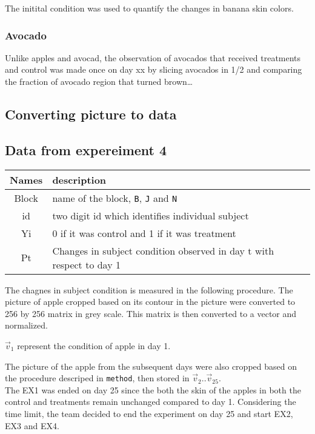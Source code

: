 \documentclass[
]{article}
\begin{document}
The initital condition was used to quantify the changes in banana skin
colors.

\hypertarget{avocado}{%
\subsubsection{Avocado}\label{avocado}}

Unlike apples and avocad, the observation of avocados that received
treatments and control was made once on day xx by slicing avocados in
1/2 and comparing the fraction of avocado region that turned
brown\ldots{}

\hypertarget{converting-picture-to-data}{%
\subsection{Converting picture to
data}\label{converting-picture-to-data}}

\hypertarget{data-from-expereiment-4}{%
\subsection{Data from expereiment 4}\label{data-from-expereiment-4}}

\begin{longtable}[]{@{}cl@{}}
\toprule
Names & description\tabularnewline
\midrule
\endhead
Block & name of the block, \texttt{B}, \texttt{J} and
\texttt{N}\tabularnewline
id & two digit id which identifies individual subject\tabularnewline
Yi & 0 if it was control and 1 if it was treatment\tabularnewline
Pt & Changes in subject condition observed in day t with respect to day
1\tabularnewline
\bottomrule
\end{longtable}

The chagnes in subject condition is measured in the following procedure.
The picture of apple cropped based on its contour in the picture were
converted to 256 by 256 matrix in grey scale. This matrix is then
converted to a vector and normalized.

\(\vec{v}_1\) represent the condition of apple in day 1.

The picture of the apple from the subsequent days were also cropped
based on the procedure descriped in \texttt{method}, then stored in
\(\vec{v}_2 .. \vec{v}_{25}\).\\
The EX1 was ended on day 25 since the both the skin of the apples in
both the control and treatments remain unchanged compared to day 1.
Considering the time limit, the team decided to end the experiment on
day 25 and start EX2, EX3 and EX4.
\end{document}
